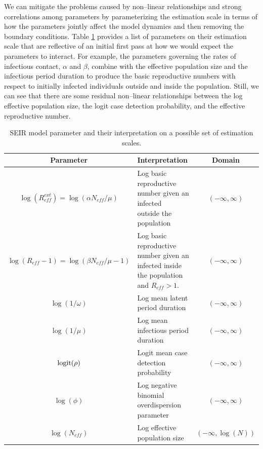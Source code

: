 We can mitigate the problems caused by non--linear relationships and strong correlations among parameters by parameterizing the estimation scale in terms of how the parameters jointly affect the model dynamics and then removing the boundary conditions. Table \ref{tab:seir_params_est2} provides a list of parameters on their estimation scale that are reflective of an initial first pass at how we would expect the parameters to interact. For example, the parameters governing the rates of infectious contact, $ \alpha$ and $\beta $, combine with the effective population size and the infectious period duration to produce the basic reproductive numbers with respect to initially infected individuals outside and inside the population. Still, we can see that there are some residual non--linear relationships between the log effective population size, the logit case detection probability, and the effective reproductive number.

\begin{table}[htbp]
	\caption{SEIR model parameter and their interpretation on a possible set of estimation scales.}
	\label{tab:seir_params_est2}
	\footnotesize
	\centering
	\begin{tabular}{clc}
		\hline
		\textbf{Parameter} & \textbf{Interpretation} & \textbf{Domain}\\
		\hline
		$\log(R_{eff}^{ext}) = \log(\alpha N_{eff} / \mu)$ & \makecell[l]{Log basic reproductive number given an infected \\outside the population} & $(-\infty,\infty) $ \\
		$ \log(R_{eff} - 1) = \log(\beta N_{eff}/\mu - 1) $ & \makecell[l]{Log basic reproductive number given an infected\\ inside the population and $ R_{eff} > 1 $.} & $(-\infty,\infty) $\\
		$ \log(1/\omega) $ & Log mean latent period duration & $(-\infty,\infty) $\\
		$ \log(1/\mu) $ & Log mean infectious period duration & $ (-\infty,\infty) $\\
		$ \mathrm{logit}(\rho) $ & Logit mean case detection probability & $(-\infty,\infty) $\\
		$ \log(\phi) $ & Log negative binomial overdispersion parameter & $ (-\infty,\infty) $ \\
		$ \log(N_{eff}) $ & Log effective population size & $(-\infty,\log(N))$\\
		\hline
	\end{tabular}
\end{table}


